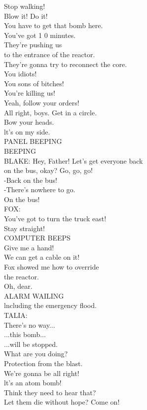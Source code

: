 \documentclass{article}
\begin{document}
\begin{multicols}{3}
Stop walking!\\
Blow it! Do it!\\
You have to get that bomb here.\\
You've got 1 0 minutes.\\
They're pushing us\\
to the entrance of the reactor.\\
They're gonna try to reconnect the core.\\
You idiots!\\
You sons of bitches!\\
You're killing us!\\
Yeah, follow your orders!\\
All right, boys. Get in a circle.\\
Bow your heads.\\
lt's on my side.\\
PANEL BEEPING\\
BEEPING\\
BLAKE: Hey, Father! Let's get everyone back\\
on the bus, okay? Go, go, go!\\
-Back on the bus!\\
-There's nowhere to go.\\
On the bus!\\
FOX:\\
You've got to turn the truck east!\\
Stay straight!\\
COMPUTER BEEPS\\
Give me a hand!\\
We can get a cable on it!\\
Fox showed me how to override\\
the reactor.\\
Oh, dear.\\
ALARM WAILING\\
lncluding the emergency flood.\\
TALIA:\\
There's no way...\\
...this bomb...\\
...will be stopped.\\
What are you doing?\\
Protection from the blast.\\
We're gonna be all right!\\
lt's an atom bomb!\\
Think they need to hear that?\\
Let them die without hope? Come on!\\

\end{multicols}
\end{document}
